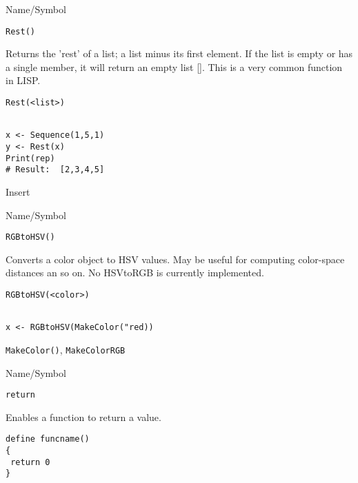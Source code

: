 \rl


\begin{desc}{Name/Symbol}
\item[Name/Symbol]  \verb+Rest()+

\item[Description]  Returns the 'rest' of a list; a list minus its
  first element.  If the list is empty or has a single member, it will
  return an empty list [].  This is a very common function in LISP.

\item[Usage]        	
\begin{verbatim}
Rest(<list>)
\end{verbatim}
			  
\item[Example]     	
\begin{verbatim}

x <- Sequence(1,5,1)
y <- Rest(x)
Print(rep)
# Result:  [2,3,4,5]
\end{verbatim}

\item[See Also]	
Insert
\end{desc}

\rl


\begin{desc}{Name/Symbol}
\item[Name/Symbol]  \verb+RGBtoHSV()+

\item[Description]  Converts a color object to HSV values.  May be useful for computing color-space
distances an so on.  No HSVtoRGB is currently implemented.

\item[Usage]        	
\begin{verbatim}
RGBtoHSV(<color>)
\end{verbatim}
			  
\item[Example]     	
\begin{verbatim}

x <- RGBtoHSV(MakeColor("red))

\end{verbatim}

\item[See Also]	
   \verb+MakeColor()+, \verb+MakeColorRGB+
\end{desc}

\rl


\begin{desc}{Name/Symbol}
\item[Name/Symbol] 	\verb+return+

\item[Description]  	Enables a function to return a value.

\item[Usage]
\begin{verbatim}
define funcname()
{
 return 0
}
\end{verbatim}

\item[Example]	

\item[See Also]	
\end{desc}

